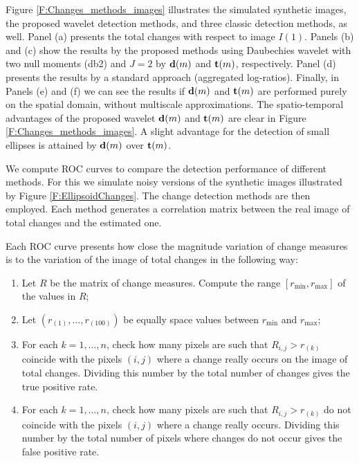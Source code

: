 \documentclass[journal]{IEEEtran}
\newcommand{\vd}{{\textbf d}}
\newcommand{\vt}{{\textbf t}}
\begin{document}
Figure \ref{F:Changes_methods_images} illustrates the simulated synthetic images, the proposed wavelet detection methods, and three classic detection methods, as well. Panel (a) presents the total changes with respect to image $I(1)$. Panels (b) and (c) show the results by the proposed methods using Daubechies wavelet with two null moments (db2) and $J=2$ by $\vd(m)$ and $\vt(m)$, respectively. Panel (d) presents the results by a standard approach (aggregated log-ratios). Finally, in Panels (e) and (f)  we can see the results if $\vd(m)$ and $\vt(m)$ are performed purely on the spatial domain, without multiscale approximations. The spatio-temporal advantages of the proposed wavelet  $\vd(m)$ and $\vt(m)$ are clear in Figure \ref{F:Changes_methods_images}. A slight advantage for the detection of small ellipses is attained by $\vd(m)$ over $\vt(m)$.   


We compute ROC curves to compare the detection performance of different methods. For this we simulate noisy versions of the synthetic images illustrated by Figure \ref{F:EllipsoidChanges}. The change detection methods are then employed. Each method generates a correlation matrix between the real image of total changes and the estimated one.

Each ROC curve presents how close the magnitude variation of change measures is to the variation of the image of total changes in the following way:
\begin{enumerate}
\item Let $R$ be the matrix of change measures. Compute the range $[r_{\min},r_{\max}]$ of the values in $R$;
\item Let $(r_{(1)},\ldots,r_{(100)})$ be equally space values between $r_{\min}$ and $r_{\max}$;
\item For each $k=1,\ldots,n$, check how many pixels are such that $R_{i,j}>r_{(k)}$ coincide with the pixels $(i,j)$ where a change really occurs on the image of total changes. Dividing this number by the total number of changes gives the true positive rate.
\item For each $k=1,\ldots,n$, check how many pixels are such that $R_{i,j}>r_{(k)}$  do not coincide with the pixels $(i,j)$ where a change really occurs. Dividing this number by the total number of pixels where changes do not occur gives the false positive rate.
\end{enumerate}
\end{document}
